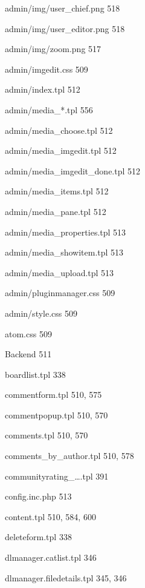 \documentclass{book}
\renewcommand\subitem{\par}
\begin{document}
\begin{multicols}{2}
\begin{osp-index}
    \subitem admin/img/user\_chief.png\hspace{1mm} 518
    \subitem admin/img/user\_editor.png\hspace{1mm} 518
    \subitem admin/img/zoom.png\hspace{1mm} 517
    \subitem admin/imgedit.css\hspace{1mm} 509
    \subitem admin/index.tpl\hspace{1mm} 512
    \subitem admin/media\_*.tpl\hspace{1mm} 556
    \subitem admin/media\_choose.tpl\hspace{1mm} 512
    \subitem admin/media\_imgedit.tpl\hspace{1mm} 512
    \subitem admin/media\_imgedit\_done.tpl\hspace{1mm} 512
    \subitem admin/media\_items.tpl\hspace{1mm} 512
    \subitem admin/media\_pane.tpl\hspace{1mm} 512
    \subitem admin/media\_properties.tpl\hspace{1mm} 513
    \subitem admin/media\_showitem.tpl\hspace{1mm} 513
    \subitem admin/media\_upload.tpl\hspace{1mm} 513
    \subitem admin/pluginmanager.css\hspace{1mm} 509
    \subitem admin/style.css\hspace{1mm} 509
    \subitem atom.css\hspace{1mm} 509
    \subitem Backend\hspace{1mm} 511
    \subitem boardlist.tpl\hspace{1mm} 338
    \subitem commentform.tpl\hspace{1mm} 510, 575
    \subitem commentpopup.tpl\hspace{1mm} 510, 570
    \subitem comments.tpl\hspace{1mm} 510, 570
    \subitem comments\_by\_author.tpl\hspace{1mm} 510, 578
    \subitem communityrating\_\ldots.tpl\hspace{1mm} 391
    \subitem config.inc.php\hspace{1mm} 513
    \subitem content.tpl\hspace{1mm} 510, 584, 600
    \subitem deleteform.tpl\hspace{1mm} 338
    \subitem dlmanager.catlist.tpl\hspace{1mm} 346
    \subitem dlmanager.filedetails.tpl\hspace{1mm} 345, 346

\end{osp-index}
\end{multicols}
\end{document}
